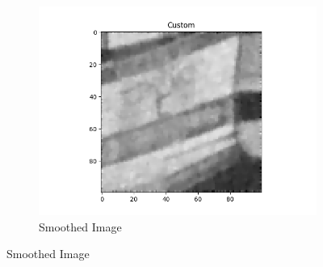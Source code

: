 \documentclass{article}
\begin{document}
\begin{center}
\begin{figure}[!htb]
\begin{center}
        \hfill
        \begin{subfigure}[b]{0.5\textwidth}
          \includegraphics[width=\textwidth]{../generated_images/Custom_test2.png}
          \caption{Smoothed Image}
        \end{subfigure}
      \end{center}
    \end{figure}
  \end{center}
\end{document}
